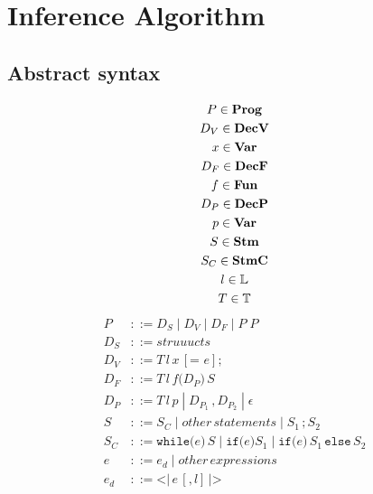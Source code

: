 
\section{Inference Algorithm}

\subsection{Abstract syntax}

\newcommand{\gp}{\; | \;} %

\begin{gather*}
  P \in \mathbf{Prog}\\
  D_V \in \mathbf{DecV}\\
  x \in \mathbf{Var}\\
  D_F \in \mathbf{DecF} \\
  f \in \mathbf{Fun}\\
  D_P \in \mathbf{DecP}\\
  p \in \mathbf{Var}\\
  S \in \mathbf{Stm}\\
  S_C \in \mathbf{StmC}\\
  l \in \mathbb{L}\\
  T \in \mathbb{T}\\
\end{gather*}
\begin{align*}
  P       & ::= D_S \gp D_V \gp D_F \gp P \; P\\
  D_S     & ::= struuucts\\
  D_V     & ::= T \, l \, x \, [\texttt{= } e] \texttt{;}\\
  D_F     & ::= T \, l \, f \texttt{(} D_P \texttt{)} \, S\\
  D_P     & ::= T \, l \, p \gp D_{P_1} \, \texttt{,} \, D_{P_2} \gp \epsilon\\
  S       & ::= S_C \gp other \, statements \gp S_1 \, \texttt{;} \, S_2\\
  S_C     & ::= \texttt{while(} e \texttt{)} \, S \gp \texttt{if(} e \texttt{)} S_1 \gp \texttt{if(} e \texttt{)} \, S_1 \, \texttt{else} \, S_2\\
  e       & ::= e_d \gp other \, expressions\\
  e_d     & ::= \texttt{<|} \, e \, [\texttt{,} \, l] \, \texttt{|>}
\end{align*}


